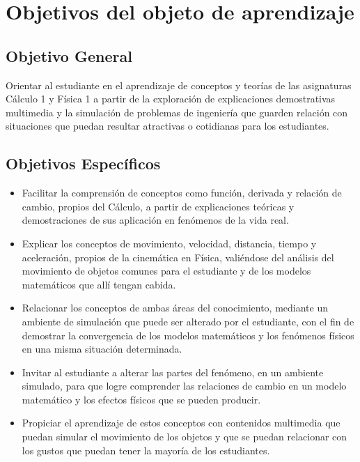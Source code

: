 \documentclass[twoside,letterpaper,12pt]{report}
\begin{document}


\section{Objetivos del objeto de aprendizaje} %
\label{sec:objetivos_del_objeto_de_aprendizaje}

\subsection{Objetivo General} %
\label{sub:objetivo_general}

Orientar al estudiante en el aprendizaje de conceptos y teorías de las asignaturas Cálculo 1 y Física 1 a partir de la exploración de explicaciones demostrativas multimedia y la simulación de problemas de ingeniería que guarden relación con situaciones que puedan resultar atractivas o cotidianas para los estudiantes.


\subsection{ Objetivos Específicos} %
\label{sub:_objetivos_espec_ficos}

\begin{itemize}
	\item Facilitar la comprensión de conceptos como función, derivada y relación de cambio, propios del Cálculo, a partir de explicaciones teóricas y demostraciones de sus aplicación en fenómenos de la vida real.

	\item Explicar los conceptos de movimiento, velocidad, distancia, tiempo y aceleración, propios de la cinemática en Física, valiéndose del análisis del movimiento de objetos comunes para el estudiante y de los modelos matemáticos que allí tengan cabida.

	\item Relacionar los conceptos de ambas áreas del conocimiento, mediante un ambiente de simulación que puede ser alterado por el estudiante, con el fin de demostrar la convergencia de los modelos matemáticos y los fenómenos físicos en una misma situación determinada.

	\item Invitar al estudiante a alterar las partes del fenómeno, en un ambiente simulado, para que logre comprender las relaciones de cambio en un modelo matemático y los efectos físicos que se pueden producir.

	\item Propiciar el aprendizaje de estos conceptos con contenidos multimedia que puedan simular el movimiento de los objetos y que se puedan relacionar con los gustos que puedan tener la mayoría de los estudiantes.

\end{itemize}
\end{document}
